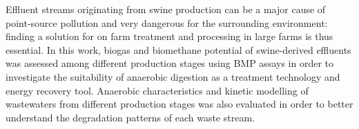 Effluent streams originating from swine production can be a major cause of point-source pollution and very dangerous for the surrounding environment: finding a solution for on farm treatment and processing in large farms is thus essential. In this work, biogas and biomethane potential of swine-derived effluents was assessed among different production stages using BMP assays in order to investigate the suitability of anaerobic digestion as a treatment technology and energy recovery tool. Anaerobic characteristics and kinetic modelling of wastewaters from different production stages was also evaluated in order to better understand the degradation patterns of each waste stream.